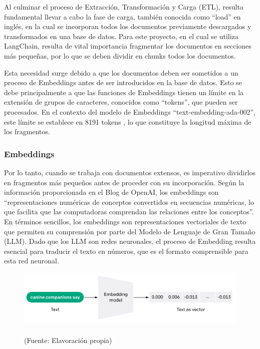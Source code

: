 \par Al culminar el proceso de Extracción, Transformación y Carga (ETL), resulta fundamental llevar a cabo la fase de carga, 
también conocida como ``load'' en inglés, en la cual se incorporan todos los documentos previamente descargados y transformados 
en una base de datos. Para este proyecto, en el cual se utiliza LangChain, resulta de vital importancia fragmentar los documentos 
en secciones más pequeñas, por lo que se deben dividir en chunks todos los documentos.

\par Esta necesidad surge debido a que los documentos deben ser sometidos a un proceso de Embeddings antes de ser 
introducidos en la base de datos. Esto se debe principalmente a que las funciones de Embeddings tienen un límite en la extensión 
de grupos de caracteres, conocidos como ``tokens'', que pueden ser procesados. En el contexto del modelo de Embeddings 
``text-embedding-ada-002'', este límite se establece en 8191 tokens \cite{openai1}, lo que constituye la longitud máxima de los fragmentos.

\subsubsection{Embeddings}



\par Por lo tanto, cuando se trabaja con documentos extensos, es imperativo dividirlos en fragmentos más pequeños antes de proceder 
con su incorporación. Según la información proporcionada en el Blog de OpenAI, los embeddings son ``representaciones numéricas 
de conceptos convertidos en secuencias numéricas, lo que facilita que las computadoras comprendan las relaciones entre los 
conceptos''\cite{openai1}. En términos sencillos, los embeddings son representaciones vectoriales de texto que permiten su comprensión por 
parte del Modelo de Lenguaje de Gran Tamaño (LLM). Dado que los LLM son redes neuronales, el proceso de Embedding resulta 
esencial para traducir el texto en números, que es el formato comprensible para esta red neuronal.

\begin{figure}[ht!]
    \centering
    \includegraphics[width=.5\textwidth]{figures/huemul4.png}
    \caption[]{\\
    {\scriptsize (Fuente: Elavoración propia)}}
    \label{fig:chatbot1}
\end{figure}

